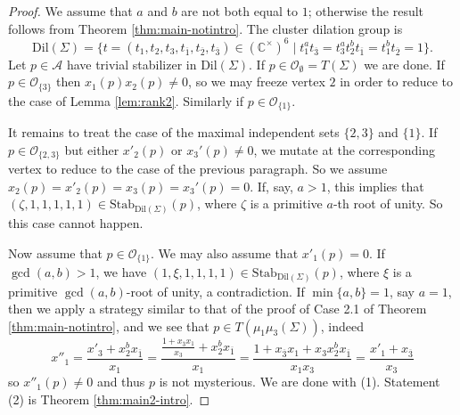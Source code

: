 \documentclass{amsart}
\newcommand{\seed}{\Sigma}
\newcommand{\var}{\mathcal{A}}
\newcommand{\Stab}{\mathrm{Stab}}
\newcommand{\C}{\mathbb{C}}
\numberwithin{equation}{section}
\theoremstyle{definition}
\newcommand{\dil}{\mathrm{Dil}}
\newcommand{\JS}[1]{\textcolor{teal}{[JS: \footnotesize #1]}}
\newcommand{\cS}[1]{\textcolor{purple}{[SN: \footnotesize $\blacksquare$ #1 $\blacksquare$]}}
\begin{document}
\begin{proof}
We assume that $a$ and $b$ are not both equal to $1$; otherwise the result follows from Theorem \ref{thm:main-notintro}. The cluster dilation group is
\[
\dil(\seed) = \{t = (t_1, t_2, t_3, t_{\overline{1}}, t_{\overline{2}}, t_{\overline{3}}) \in  (\C^{\times})^{6} \mid t_1^{a}t_{\overline{3}} = t_3^{a}t_2^{b}t_{\overline{1}} = t_{1}^{b}t_{\overline{2}} = 1\}.
\]
Let $p \in \var$ have trivial stabilizer in $\dil(\seed)$. If $p \in \mathcal{O}_{\emptyset} = T(\seed)$ we are done. If $p \in \mathcal{O}_{\{3\}}$ then $x_1(p)x_2(p)\neq 0$, so we may freeze vertex $2$ in order to reduce to the case of Lemma \ref{lem:rank2}. Similarly if $p \in \mathcal{O}_{\{1\}}$. 

It remains to treat the case of the maximal independent sets $\{2,3\}$ and $\{1\}$. If $p \in \mathcal{O}_{\{2,3\}}$ but either $x'_2(p)$ or $x_3'(p) \neq 0$, we mutate at the corresponding vertex to reduce to the case of the previous paragraph. So we assume $x_2(p) = x'_2(p) = x_3(p) = x_3'(p) = 0$. If, say, $a > 1$, this implies that $(\zeta, 1, 1, 1, 1, 1) \in \Stab_{\dil(\seed)}(p)$, where $\zeta$ is a primitive $a$-th root of unity. So this case cannot happen.

Now assume that $p \in \mathcal{O}_{\{1\}}$. We may also assume that $x'_1(p) = 0$. If $\gcd(a,b) > 1$, we have $(1, \xi, 1, 1, 1, 1) \in \Stab_{\dil(\seed)}(p)$, where $\xi$ is a primitive $\gcd(a,b)$-root of unity, a contradiction. If $\min\{a,b\} = 1$, say $a = 1$, then we apply a strategy similar to that of the proof of Case 2.1 of Theorem \ref{thm:main-notintro}, and we see that $p \in T(\mu_1\mu_3(\seed))$, indeed
\[
x''_1 = \frac{x'_3 + x_2^{b}x_{\overline{1}}}{x_1} = 
\frac{\frac{1 + x_{\overline{3}}x_1}{x_3}+ x_2^{b}x_{\overline{1}}}{x_1} = 
\frac{1 + x_{\overline{3}}x_1 + x_{3}x_2^{b}x_{\overline{1}}}{x_1x_3} = 
\frac{x'_1 + x_{\overline{3}}}{x_3}
\]
so $x''_1(p) \neq 0$ and thus $p$ is not mysterious. We are done with (1). Statement (2) is Theorem \ref{thm:main2-intro}. %
\end{proof}





\end{document}
